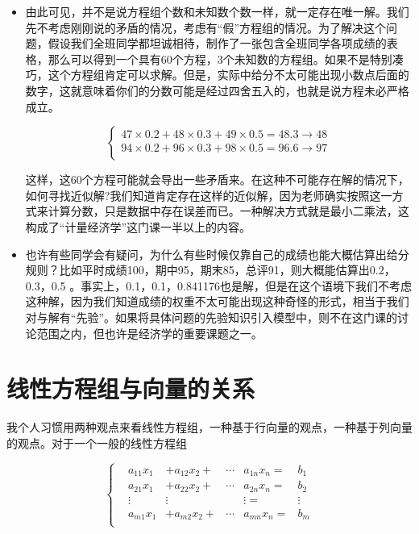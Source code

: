 \documentclass[hyperref,]{ctexart}
\begin{document}
\begin{itemize}
\item
  由此可见，并不是说方程组个数和未知数个数一样，就一定存在唯一解。我们先不考虑刚刚说的矛盾的情况，考虑有``假''方程组的情况。为了解决这个问题，假设我们全班同学都坦诚相待，制作了一张包含全班同学各项成绩的表格，那么可以得到一个具有60个方程，3个未知数的方程组。如果不是特别凑巧，这个方程组肯定可以求解。但是，实际中给分不太可能出现小数点后面的数字，这就意味着你们的分数可能是经过四舍五入的，也就是说方程未必严格成立。

  \begin{equation}
  \left\{
  \begin{aligned}
  47\times 0.2 + 48\times 0.3 + 49\times 0.5=48.3\rightarrow 48\\
  94\times 0.2 + 96\times 0.3 + 98\times 0.5=96.6\rightarrow 97\\
  \end{aligned}\right.
  \end{equation}

  这样，这60个方程可能就会导出一些矛盾来。在这种不可能存在解的情况下，如何寻找近似解?我们知道肯定存在这样的近似解，因为老师确实按照这一方式来计算分数，只是数据中存在误差而已。一种解决方式就是最小二乘法，这构成了``计量经济学''这门课一半以上的内容。
\item
  也许有些同学会有疑问，为什么有些时候仅靠自己的成绩也能大概估算出给分规则？比如平时成绩100，期中95，期末85，总评91，则大概能估算出0.2，0.3，0.5
  。事实上，0.1，0.1，0.841176也是解，但是在这个语境下我们不考虑这种解，因为我们知道成绩的权重不太可能出现这种奇怪的形式，相当于我们对与解有``先验''。如果将具体问题的先验知识引入模型中，则不在这门课的讨论范围之内，但也许是经济学的重要课题之一。
\end{itemize}

\section{线性方程组与向量的关系}

我个人习惯用两种观点来看线性方程组，一种基于行向量的观点，一种基于列向量的观点。对于一个一般的线性方程组

\begin{equation}
\left\{
\begin{aligned}
&a_{11}x_1&+a_{12}x_2+&\cdots &a_{1n}x_n = &b_1\\
&a_{21}x_1&+a_{22}x_2+&\cdots& a_{2n}x_n = &b_2\\
&\vdots&\vdots&&\vdots=&\vdots\\
&a_{m1}x_1&+a_{m2}x_2+&\cdots& a_{mn}x_n = &b_m\\
\end{aligned}\right.
\end{equation}
\end{document}
